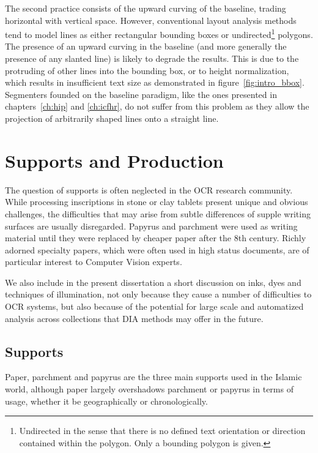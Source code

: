 The second practice consists of the upward curving of the baseline, trading
horizontal with vertical space. However, conventional layout analysis methods
tend to model lines as either rectangular bounding boxes or
undirected\footnote{Undirected in the sense that there is no defined text
orientation or direction contained within the polygon. Only a bounding polygon
is given.} polygons. The presence of an upward curving in the baseline (and
more generally the presence of any slanted line) is likely to degrade the
results. This is due to the protruding of other lines into the bounding box, or
to height normalization, which results in insufficient text size as
demonstrated in figure~\ref{fig:intro_bbox}. Segmenters founded on the baseline
paradigm, like the ones presented in chapters~\ref{ch:hip} and \ref{ch:icfhr},
do not suffer from this problem as they allow the projection of arbitrarily
shaped lines onto a straight line.

\section{Supports and Production}

The question of supports is often neglected in the OCR research community.
While processing inscriptions in stone or clay tablets present unique and
obvious challenges, the difficulties that may arise from subtle differences of
supple writing surfaces are usually disregarded. Papyrus and parchment were
used as writing material until they were replaced by cheaper paper after the
8th century. Richly adorned specialty papers, which were often used in high
status documents, are of particular interest to Computer Vision experts.

We also include in the present dissertation a short discussion on inks, dyes
and techniques of illumination, not only because they cause a number of
difficulties to OCR systems, but also because of the potential for large scale
and automatized analysis across collections that DIA methods may offer in the
future. 

\subsection{Supports}

Paper, parchment and papyrus are the three main supports used in the Islamic
world, although paper largely overshadows parchment or papyrus in terms of
usage, whether it be geographically or chronologically.

